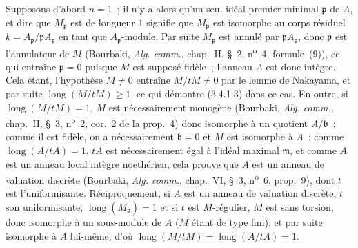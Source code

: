 Supposons d'abord $n=1$~; il n'y a alors qu'un seul idéal premier minimal
$\mathfrak p$ de $A$, et dire que $M_{\mathfrak p}$ est de longueur $1$
signifie que $M_{\mathfrak p}$ est isomorphe au corps résiduel
$k=A_{\mathfrak p}/\mathfrak pA_{\mathfrak p}$ en tant que
$A_{\mathfrak p}$-module. Par suite $M_{\mathfrak p}$ est annulé par
$\mathfrak pA_{\mathfrak p}$, donc $\mathfrak p$ est l'annulateur de $M$
(Bourbaki, \emph{Alg. comm.}, chap.~II, \S~2, n\textsuperscript{o}~4,
formule~(9)), ce qui entraîne $\mathfrak p=0$ puisque $M$ est supposé fidèle~;
l'anneau $A$ est donc intègre. Cela étant, l'hypothèse $M\neq0$ entraîne
$M/tM\neq0$ par le lemme de Nakayama, et par suite
$\operatorname{long}(M/tM)\geqslant1$, ce qui démontre (3.4.1.3) dans ce cas.
En outre, si $\operatorname{long}(M/tM)=1$, $M$ est nécessairement monogène
(Bourbaki, \emph{Alg. comm.}, chap.~II, \S~3, n\textsuperscript{o}~2, cor.~2
de la prop.~4) donc isomorphe à un quotient $A/\mathfrak b$~; comme il est
fidèle, on a nécessairement $\mathfrak b=0$ et $M$ est isomorphe à $A$~;
comme $\operatorname{long}(A/tA)=1$, $tA$ est nécessairement égal à l'idéal
maximal $\mathfrak m$, et comme $A$ est un anneau local intègre noethérien,
cela prouve que $A$ est un anneau de valuation discrète (Bourbaki,
\emph{Alg. comm.}, chap.~VI, \S~3, n\textsuperscript{o}~6, prop.~9), dont $t$
est l'uniformisante. Réciproquement, si $A$ est un anneau de valuation
discrète, $t$ son uniformisante, $\operatorname{long}(M_{\mathfrak p})=1$ et
si $t$ est $M$-régulier, $M$ est sans torsion, donc isomorphe à un sous-module
de $A$ ($M$ étant de type fini), et par suite isomorphe à $A$ lui-même, d'où
$\operatorname{long}(M/tM)=\operatorname{long}(A/tA)=1$.

